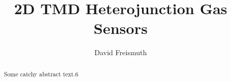 \documentclass{article}
\begin{document}
\title{2D TMD Heterojunction Gas Sensors}
\author{David Freismuth}

\maketitle

\begin{abstract}
Some catchy abstract text.6
\end{abstract}










\printglossaries
\end{document}
